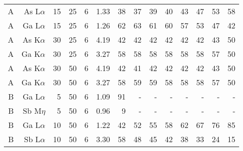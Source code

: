 \begin{table}[phtb]
\begin{center}
\begin{tabular}{rrrrrrrrrrrrrr}
            A            & As L$\alpha$  & 15             & 25             & 6           & 1.33              & 38             & 37           & 39            & 40             & 43             & 47             & 53            & 58             \\
            A            & Ga L$\alpha$  & 15             & 25             & 6           & 1.26              & 62             & 63           & 61            & 60             & 57             & 53             & 47            & 42             \\
            A            & As K$\alpha$  & 30             & 25             & 6           & 4.19              & 42             & 42           & 42            & 42             & 42             & 42             & 43            & 50             \\
            A            & Ga K$\alpha$  & 30             & 25             & 6           & 3.27              & 58             & 58           & 58            & 58             & 58             & 58             & 57            & 50             \\
            A            & As K$\alpha$  & 30             & 50             & 6           & 4.19              & 42             & 41           & 42            & 42             & 42             & 42             & 43            & 50             \\
            A            & Ga K$\alpha$  & 30             & 50             & 6           & 3.27              & 58             & 59           & 59            & 58             & 58             & 58             & 57            & 50             \\
            \hline
            B            & Ga L$\alpha$  & 5              & 50             & 6           & 1.09              & 91             & -            & -             & -              & -              & -              & -             & -              \\
            B            & Sb M$\eta$    & 5              & 50             & 6           & 0.96              & 9              & -            & -             & -              & -              & -              & -             & -              \\
            B            & Ga L$\alpha$  & 10             & 50             & 6           & 1.22              & 42             & 52           & 55            & 58             & 62             & 67             & 76            & 85             \\
            B            & Sb L$\alpha$  & 10             & 50             & 6           & 3.30              & 58             & 48           & 45            & 42             & 38             & 33             & 24            & 15             \\

\end{tabular}
\end{center}
\end{table}
